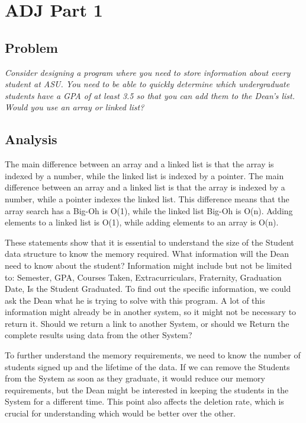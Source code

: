 \documentclass{article}
\begin{document}
\section{ADJ Part 1}

\subsection{Problem}

\textit{Consider designing a program where you need to store information about every student at ASU. You
need to be able to quickly determine which undergraduate students have a GPA of at least 3.5 so that you
can add them to the Dean's list. Would you use an array or linked list?}

\subsection{Analysis}

The main difference between an array and a linked list is that the array is indexed by a number, while the linked list is indexed by a pointer. The main difference between an array and a linked list is that the array is indexed by a number, while a pointer indexes the linked list. This difference means that the array search has a Big-Oh is O(1), while the linked list Big-Oh is O(n). Adding elements to a linked list is O(1), while adding elements to an array is O(n). 

These statements show that it is essential to understand the size of the Student data structure to know the memory required. What information will the Dean need to know about the student? Information might include but not be limited to: Semester, GPA, Courses Taken, Extracurriculars, Fraternity, Graduation Date, Is the Student Graduated. To find out the specific information, we could ask the Dean what he is trying to solve with this program. A lot of this information might already be in another system, so it might not be necessary to return it. Should we return a link to another System, or should we Return the complete results using data from the other System? 

To further understand the memory requirements, we need to know the number of students signed up and the lifetime of the data. If we can remove the Students from the System as soon as they graduate, it would reduce our memory requirements, but the Dean might be interested in keeping the students in the System for a different time. This point also affects the deletion rate, which is crucial for understanding which would be better over the other. 
\end{document}
